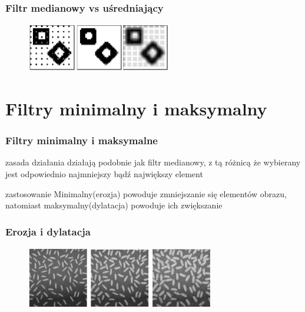 \documentclass{beamer}
\begin{document}
\begin{frame}
\frametitle{Filtr medianowy vs uśredniający}
\begin{figure}
\includegraphics[height=80px]{median_vs_avg1}
\end{figure}
\end{frame}
\section{Filtry minimalny i maksymalny}
\begin{frame}
\frametitle{Filtry minimalny i maksymalne}
\begin{block}{zasada działania}
działają podobnie jak filtr medianowy, z tą różnicą że wybierany jest odpowiednio najmniejszy bądź największy element
\end{block}
\begin{block}{zastosowanie}
Minimalny(erozja) powoduje zmniejszanie się elementów obrazu, natomiast maksymalny(dylatacja) powoduje ich zwiększanie
\end{block}
\end{frame}
\begin{frame}
\frametitle{Erozja i dylatacja}
\begin{figure}
\includegraphics[width=100px]{min_max_min}
\includegraphics[width=100px]{min_max_orig}
\includegraphics[width=100px]{min_max_max}
\end{figure}
\end{frame}
\end{document}
